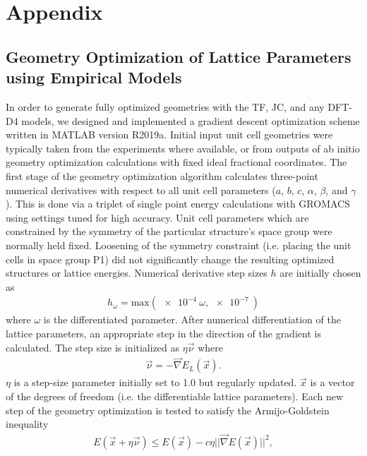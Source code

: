 \documentclass[aip,preprint,amsmath,amssymb,hidelinks]{revtex4-1}
\begin{document}
	\clearpage
	
	\clearpage
	
	\section{Appendix}
	
	\subsection{Geometry Optimization of Lattice Parameters using Empirical Models}
	\label{EmpiricalGeometryOpt}
	
	In order to generate fully optimized geometries with the TF, JC, and any DFT-D4 models, we designed and implemented a gradient descent optimization scheme written in MATLAB version R2019a. Initial input unit cell geometries were typically taken from the experiments where available, or from outputs of ab initio geometry optimization calculations with fixed ideal fractional coordinates. The first stage of the geometry optimization algorithm calculates three-point numerical derivatives with respect to all unit cell parameters ($a$, $b$, $c$, $\alpha$, $\beta$, and $\gamma$). This is done via a triplet of single point energy calculations with GROMACS using settings tuned for high accuracy. Unit cell parameters which are constrained by the symmetry of the particular structure's space group were normally held fixed. Loosening of the symmetry constraint (i.e. placing the unit cells in space group P1) did not significantly change the resulting optimized structures or lattice energies. Numerical derivative step sizes $h$ are initially chosen as
	\begin{align}
	h_{\omega} = \text{max}(\SI{e-4}{}\omega,\SI{e-7}{}) 
	\end{align} 
	where $\omega$ is the differentiated parameter. After numerical differentiation of the lattice parameters, an appropriate step in the direction of the gradient is calculated. The step size is initialized as $\eta \vec{\nu}$ where
	\begin{align}
	\vec{\nu} = - \vec{\nabla} E_{L} (\vec{x}).
	\end{align}
	$\eta$ is a step-size parameter initially set to 1.0 but regularly updated. $\vec{x}$ is a vector of the degrees of freedom (i.e. the differentiable lattice parameters). Each new step of the geometry optimization is tested to satisfy the Armijo-Goldstein inequality~\cite{armijo1966minimization,dennis1996numerical}
	\begin{align}
	E(\vec{x} + \eta \vec{\nu}) \leq E(\vec{x}) - c \eta || \vec{\nabla} E (\vec{x}) ||^{2},
	\end{align}
\end{document}
